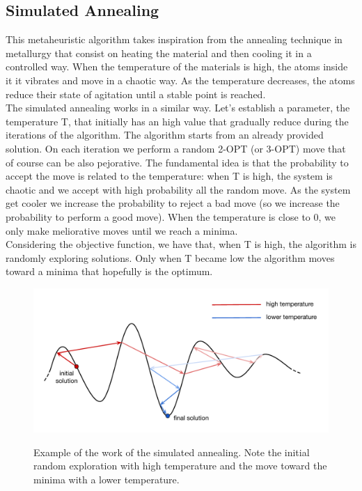 \subsection{Simulated Annealing}
This metaheuristic algorithm takes inspiration from the annealing technique in metallurgy that consist on heating the material and then cooling it in a controlled way. When the temperature of the materials is high, the atoms inside it it vibrates and move in a chaotic way. As the temperature decreases, the atoms reduce their state of agitation until a stable point is reached. \\
The simulated annealing works in a similar way. Let's establish a parameter, the temperature T, that initially has an high value that gradually reduce during the iterations of the algorithm. The algorithm starts from an already provided solution. On each iteration we perform a random 2-OPT (or 3-OPT) move that of course can be also pejorative. The fundamental idea is that the probability to accept the move is related to the temperature: when T is high, the system is chaotic and we accept with high probability all the random move. As the system get cooler we increase the probability to reject a bad move (so we increase the probability to perform a good move). When the temperature is close to 0, we only make meliorative moves until we reach a minima.\\
Considering the objective function, we have that, when T is high, the algorithm is randomly exploring solutions. Only when T became low the algorithm moves toward a minima that hopefully is the optimum.

\begin{figure}[h!]
\centering
	\includegraphics[scale=0.77]{media/sim_annealing.pdf} \\
	\caption{Example of the work of the simulated annealing. Note the initial random exploration with high temperature and the move toward the minima with a lower temperature.}
\end{figure}

